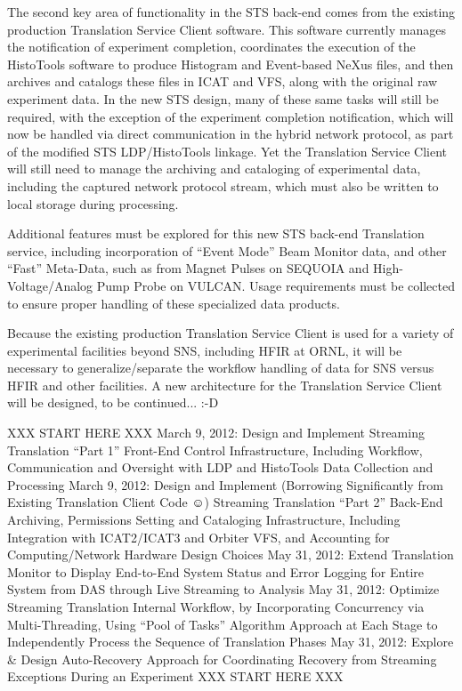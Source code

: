 The second key area of functionality in the STS back-end
comes from the existing production Translation Service Client software.
This software currently manages the
notification of experiment completion,
coordinates the execution of the HistoTools software
to produce Histogram and Event-based NeXus files,
and then archives and catalogs these files in ICAT and VFS,
along with the original raw experiment data.
In the new STS design, many of these same tasks will still be required,
with the exception of the experiment completion notification,
which will now be handled via direct communication in the
hybrid network protocol,
as part of the modified STS LDP/HistoTools linkage.
Yet the Translation Service Client will still need to manage
the archiving and cataloging of experimental data,
including the captured network protocol stream,
which must also be written to local storage during processing.

Additional features must be explored for this
new STS back-end Translation service,
including incorporation of ``Event Mode'' Beam Monitor data,
and other ``Fast'' Meta-Data,
such as from Magnet Pulses on SEQUOIA
and High-Voltage/Analog Pump Probe on VULCAN.
Usage requirements must be collected to ensure proper handling
of these specialized data products.

Because the existing production Translation Service Client
is used for a variety of experimental facilities beyond SNS,
including HFIR at ORNL,
it will be necessary to generalize/separate the workflow handling
of data for SNS versus HFIR and other facilities.
A new architecture for the Translation Service Client
will be designed,
to be continued... :-D

XXX START HERE XXX
March 9, 2012: Design and Implement Streaming Translation “Part 1” Front-End Control Infrastructure, Including Workflow, Communication and Oversight with LDP and HistoTools Data Collection and Processing
March 9, 2012: Design and Implement (Borrowing Significantly from Existing Translation Client Code ☺) Streaming Translation “Part 2” Back-End Archiving, Permissions Setting and Cataloging Infrastructure, Including Integration with ICAT2/ICAT3 and Orbiter VFS, and Accounting for Computing/Network Hardware Design Choices
May 31, 2012: Extend Translation Monitor to Display End-to-End System Status and Error Logging for Entire System from DAS through Live Streaming to Analysis
May 31, 2012: Optimize Streaming Translation Internal Workflow, by Incorporating Concurrency via Multi-Threading, Using “Pool of Tasks” Algorithm Approach at Each Stage to Independently Process the Sequence of Translation Phases
May 31, 2012: Explore \& Design Auto-Recovery Approach for Coordinating Recovery from Streaming Exceptions During an Experiment
XXX START HERE XXX

